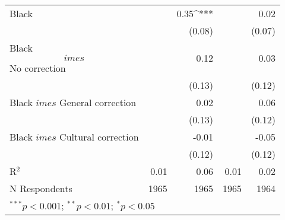 \begin{table}[h!]
\begin{center}
\begin{footnotesize}
\begin{tabular}{l D{.}{.}{4.5} D{.}{.}{4.5} D{.}{.}{4.3} D{.}{.}{4.5}}
Black                              &             & 0.35^{***}  &           & 0.02        \\
                                   &             & (0.08)      &           & (0.07)      \\
Black $$	imes$$ No correction      &             & 0.12        &           & 0.03        \\
                                   &             & (0.13)      &           & (0.12)      \\
Black $	imes$ General correction   &             & 0.02        &           & 0.06        \\
                                   &             & (0.13)      &           & (0.12)      \\
Black $	imes$ Cultural correction  &             & -0.01       &           & -0.05       \\
                                   &             & (0.12)      &           & (0.12)      \\
\midrule
R$^2$                              & 0.01        & 0.06        & 0.01      & 0.02        \\
N Respondents                      & 1965        & 1965        & 1965      & 1964        \\
\bottomrule
{}
\end{tabular}
\end{footnotesize}
\label{table:ra-source-interact}
\end{center}
\end{table} 
